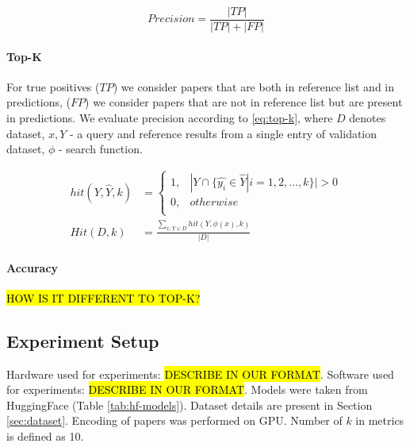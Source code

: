 \documentclass{article}
\begin{document}
            \begin{equation}
                Precision = \frac{|TP|}{|TP| + |FP|}
                \label{eq:precision}
            \end{equation}

        \paragraph{Top-K}
       
            For true positives (\(TP\)) we consider papers that are both in reference list and in predictions, (\(FP\)) we consider papers that are not in reference list but are present in predictions. We evaluate precision according to \ref{eq:top-k}, where \(D\) denotes dataset, \(x, Y\) - a query and reference results from a single entry of validation dataset, \(\phi\) - search function.


            \begin{equation}
                \begin{split}
                    hit(Y, \hat{Y}, k) &= \left\{\begin{matrix}
                        1, & | Y \cap \{\hat{y_{i}} \in \hat{Y} | i=1,2,...,k\} | > 0 \\
                        0, & otherwise \\
                       \end{matrix}\right. \\ 
                    Hit(D, k) &= \frac{\sum_{x, Y \in D} hit(Y, \phi(x), k)}{|D|}
                \end{split}
                \label{eq:top-k}
            \end{equation}

        \paragraph{Accuracy}
       
            \hl{HOW IS IT DIFFERENT TO TOP-K?}

    \subsection{Experiment Setup}
        
        Hardware used for experiments: \hl{DESCRIBE IN OUR FORMAT}. Software used for experiments: \hl{DESCRIBE IN OUR FORMAT}. Models were taken from HuggingFace (Table \ref{tab:hf-models}). Dataset details are present in Section \ref{sec:dataset}. Encoding of papers was performed on GPU. Number of \(k\) in metrics is defined as 10.
\end{document}
